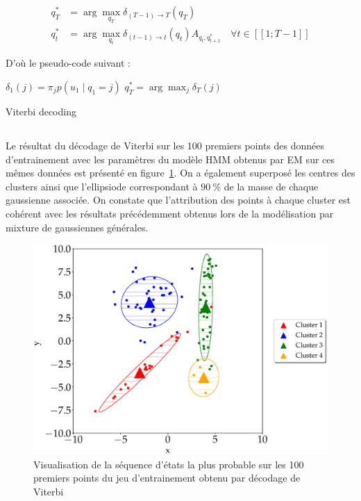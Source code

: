 \documentclass[12pt,a4paper,onecolumn]{article}
\begin{document}
\begin{align}
	q_T^* & = \operatorname{arg}\max_{q_T} \delta_{(T-1)\rightarrow T}(q_T)                                                      \\
	q_t^* & = \operatorname{arg}\max_{q_t} \delta_{(t-1)\rightarrow t}(q_t) A_{q_t, q_{t+1}^*} \quad \forall t \in [\![1;T-1]\!]
\end{align}

D'où le pseudo-code suivant :

\begin{algorithm}[H]
	\SetAlgoLined
	$\delta_1(j) = \pi_j p(u_1
		\mid q_1 = j)$\;
	$q_T^* = \operatorname{arg}\max_{j} \delta_T(j)$\;
	\caption{Viterbi decoding}
\end{algorithm}


\subsection{}

Le résultat du décodage de Viterbi sur les 100 premiers points des données d'entrainement avec les paramètres du modèle HMM obtenus par EM sur ces mêmes données est présenté en figure~\ref{fig_8_viterbi}. On a également superposé les centres des clusters ainsi que l'ellipsiode correspondant à \(90~\%\) de la masse de chaque gaussienne associée. On constate que l'attribution des points à chaque cluster est cohérent avec les résultats précédemment obtenus lors de la modélisation par mixture de gaussiennes générales.

\begin{figure}[H]
	\centering
	\includegraphics[width = 1.0\textwidth]{8_viterbi_decoding}
	\caption{Visualisation de la séquence d'états la plus probable sur les 100 premiers points du jeu d'entrainement obtenu par décodage de Viterbi}
	\label{fig_8_viterbi}
\end{figure}
\end{document}
